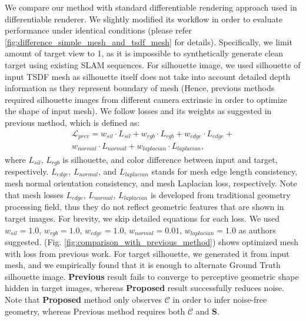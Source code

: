 We compare our method with standard differentiable rendering approach used in differentiable renderer\cite{liu2019soft}. 
We slightly modified its workflow in order to evaluate performance under identical conditions (please refer \ref{fig:difference_simple_mesh_and_tsdf_mesh} for details). 
Specifically, we limit amount of target view to 1, as it is impossible to synthetically generate clean target using existing SLAM sequences. 
For silhouette image, we used silhouette of input TSDF mesh as silhouette itself does not take into account detailed depth information as they represent boundary of mesh (Hence, previous methods required silhouette images from different camera extrinsic in order to optimize the shape of input mesh). 
We follow losses and its weights as suggested in previous method\cite{ravi2020accelerating}, which is defined as: 
\begin{multline*}
    \mathcal{L}_{prev}=w_{sil}\cdot L_{sil}+w_{rgb}\cdot L_{rgb}+w_{edge}\cdot L_{edge}+ \\ 
    w_{normal}\cdot L_{normal}+w_{laplacian}\cdot L_{laplacian}, 
\end{multline*}
where $L_{sil}$, $L_{rgb}$ is silhouette, and color difference between input and target, respectively. 
$L_{edge}$, $L_{normal}$, and $L_{laplacian}$ stands for mesh edge length consistency, mesh normal orientation consistency, and mesh Laplacian loss, respectively. 
Note that mesh losses $L_{edge}$, $L_{normal}$, $L_{laplacian}$ is developed from traditional geometry processing field, thus they do not reflect geometric features that are shown in target images. 
For brevity, we skip detailed equations for each loss. 
We used $w_{sil}=1.0$, $w_{rgb}=1.0$, $w_{edge}=1.0$, $w_{normal}=0.01$, $w_{laplacian}=1.0$ as authors suggested.
(Fig. \ref{fig:comparison_with_previous_method}) shows optimized mesh with loss from previous work. 
For target silhouette, we generated it from input mesh, and we empirically found that it is enough to alternate Ground Truth silhouette image. \textbf{Previous} result fails to converge to perceptive geometric shape hidden in target images, whereas \textbf{Proposed} result successfully reduces noise. Note that \textbf{Proposed} method only observes $\mathbf{\mathcal{C}}$ in order to infer noise-free geometry, whereas Previous method requires both $\mathbf{\mathcal{C}}$ and $\mathbf{S}$.

